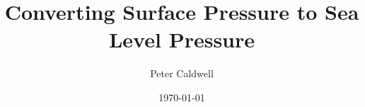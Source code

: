 \documentclass[12pt]{article}
\title{Converting Surface Pressure to Sea Level Pressure}
\author[1]{Peter Caldwell}
\date{\today}
\affil[1]{Lawrence Livermore National Lab, Livermore CA}
\begin{document}
\maketitle{}


\end{document}
